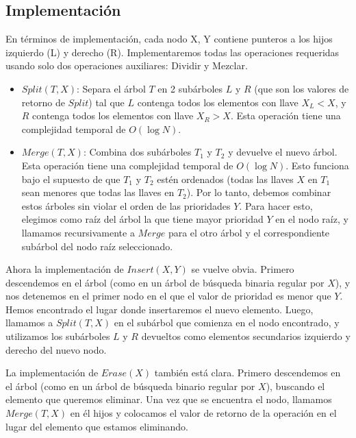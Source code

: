 \documentclass[12pt]{article}
\newcommand{\nl}{\vspace{0.3cm}}
\begin{document}
\subsection{Implementación}

En términos de implementación, cada nodo X, Y contiene punteros a los hijos izquierdo (L) y derecho (R). Implementaremos todas las operaciones requeridas usando solo dos operaciones auxiliares: Dividir y Mezclar.

\begin{itemize}
	\item $Split(T, X)$: Separa el árbol $T$ en 2 subárboles $L$ y $R$ (que son los valores de retorno de $Split$) tal que $L$ contenga todos los elementos con llave $X_L < X$, y $R$ contenga todos los elementos con llave $X_R > X$. Esta operación tiene una complejidad temporal de $O(\log N)$.
	\item $Merge(T, X)$: Combina dos subárboles $T_1$ y $T_2$ y devuelve el nuevo árbol. Esta operación tiene una complejidad temporal de $O(\log N)$. Esto funciona bajo el supuesto de que $T_1$ y $T_2$ estén ordenados (todas las llaves $X$ en $T_1$ sean menores que todas las llaves en $T_2$). Por lo tanto, debemos combinar estos árboles sin violar el orden de las prioridades $Y$. Para hacer esto, elegimos como raíz del árbol la que tiene mayor prioridad $Y$ en el nodo raíz, y llamamos recursivamente a $Merge$ para el otro árbol y el correspondiente subárbol del nodo raíz seleccionado.
\end{itemize}

Ahora la implementación de $Insert(X, Y)$ se vuelve obvia. Primero descendemos en el árbol (como en un árbol de búsqueda binaria regular por $X$), y nos detenemos en el primer nodo en el que el valor de prioridad es menor que $Y$. Hemos encontrado el lugar donde insertaremos el nuevo elemento. Luego, llamamos a $Split(T, X)$ en el subárbol que comienza en el nodo encontrado, y utilizamos los subárboles $L$ y $R$ devueltos como elementos secundarios izquierdo y derecho del nuevo nodo.

\nl

La implementación de $Erase(X)$ también está clara. Primero descendemos en el árbol (como en un árbol de búsqueda binario regular por $X$), buscando el elemento que queremos eliminar. Una vez que se encuentra el nodo, llamamos $Merge(T, X)$ en él hijos y colocamos el valor de retorno de la operación en el lugar del elemento que estamos eliminando.

\nl
\end{document}
